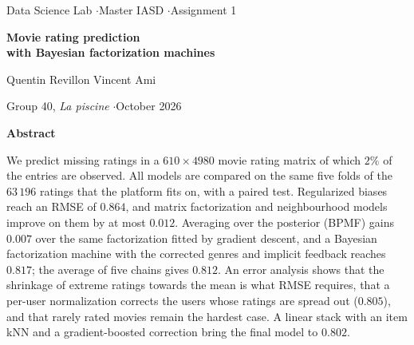 \documentclass[10pt,a4paper,twocolumn]{article}
\begin{document}
\begin{titlepage}
\onecolumn
\centering
\vspace*{3.5cm}
{\color{black!60}Data Science Lab \quad$\cdot$\quad Master IASD \quad$\cdot$\quad Assignment 1\par}
\vspace{1.4cm}
{\LARGE\bfseries Movie rating prediction\\[4pt] with Bayesian factorization machines\par}
\vspace{1.2cm}
{\large Quentin Revillon \qquad Vincent Ami\par}
\vspace{0.3cm}
{\color{black!60}Group 40, \textit{La piscine} \quad$\cdot$\quad October 2026\par}
\vspace{1.6cm}
\begin{minipage}{0.82\linewidth}
\small
\centerline{\bfseries Abstract}
\vspace{4pt}
We predict missing ratings in a $610 \times 4980$ movie rating matrix of which $2\%$ of the entries are
observed. All models are compared on the same five folds of the $63\,196$ ratings that the platform fits on,
with a paired test. Regularized biases reach an RMSE of $0.864$, and matrix factorization and neighbourhood
models improve on them by at most $0.012$. Averaging over the posterior (BPMF) gains $0.007$ over the same
factorization fitted by gradient descent, and a Bayesian factorization machine with the corrected genres and
implicit feedback reaches $0.817$; the average of five chains gives $0.812$. An error analysis shows that the
shrinkage of extreme ratings towards the mean is what RMSE requires, that a per-user normalization corrects
the users whose ratings are spread out ($0.805$), and that rarely rated movies remain the hardest case. A
linear stack with an item kNN and a gradient-boosted correction bring the final model to $0.802$.
\end{minipage}
\vspace{1.2cm}

\begin{minipage}{0.6\linewidth}
\small
\setcounter{tocdepth}{1}
\renewcommand{\contentsname}{\normalsize Contents}
\tableofcontents
\end{minipage}
\vspace*{\fill}
\end{titlepage}
\twocolumn
\setcounter{page}{1}
\end{document}
